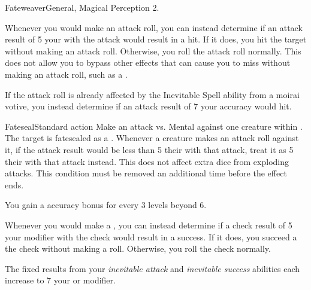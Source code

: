   \begin{feat}{Fateweaver}{General, Magical}
    \featpre Perception 2.

     Whenever you would make an attack roll, you can instead determine if an attack result of 5 \add your  with the attack would result in a hit.
    If it does, you hit the target without making an attack roll.
    Otherwise, you roll the attack roll normally.
    This does not allow you to bypass other effects that can cause you to miss without making an attack roll, such as a .

    If the attack roll is already affected by the Inevitable Spell ability from a moirai votive, you instead determine if an attack result of 7 \add your accuracy would hit.

    \begin{magicalactiveability}{Fateseal}{Standard action}
      \rankline
      Make an attack vs. Mental against one creature within \medrange.
      \hit The target is fatesealed as a .
      Whenever a creature makes an attack roll against it, if the attack result would be less than 5 \add their  with that attack, treat it as 5 \add their  with that attack instead.
      This does not affect extra dice from exploding attacks.
      \crit This condition must be removed an additional time before the effect ends.

      \rankline
      You gain a  accuracy bonus for every 3 levels beyond 6.
    \end{magicalactiveability}

     Whenever you would make a , you can instead determine if a check result of 5 \add your modifier with the check would result in a success.
    If it does, you succeed a the check without making a roll.
    Otherwise, you roll the check normally.

     The fixed results from your \textit{inevitable attack} and \textit{inevitable success} abilities each increase to 7 \add your  or modifier.
  \end{feat}

